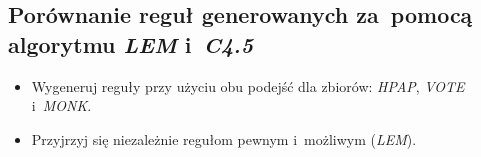 \subsection{Porównanie reguł generowanych za~pomocą algorytmu \emph{LEM} i~\emph{C4.5}}

\begin{itemize}
\item Wygeneruj reguły przy użyciu obu podejść dla zbiorów: \emph{HPAP}, \emph{VOTE} i~\emph{MONK}.
\item Przyjrzyj się niezależnie regułom pewnym i~możliwym (\emph{LEM}).
\end{itemize}

